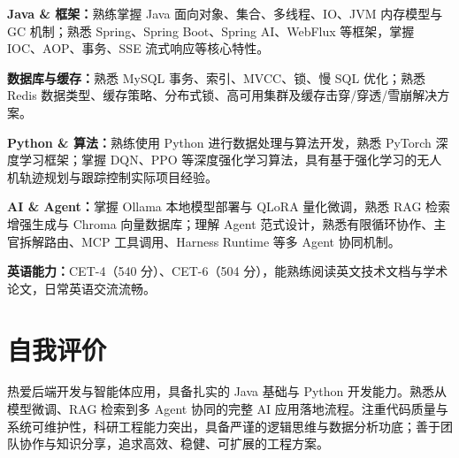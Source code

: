 \documentclass[11pt,a4paper,fontset=none]{ctexart}
\begin{document}
\par\noindent \textbf{Java \& 框架：}熟练掌握 Java 面向对象、集合、多线程、IO、JVM 内存模型与 GC 机制；熟悉 Spring、Spring Boot、Spring AI、WebFlux 等框架，掌握 IOC、AOP、事务、SSE 流式响应等核心特性。

\par\noindent \textbf{数据库与缓存：}熟悉 MySQL 事务、索引、MVCC、锁、慢 SQL 优化；熟悉 Redis 数据类型、缓存策略、分布式锁、高可用集群及缓存击穿/穿透/雪崩解决方案。

\par\noindent \textbf{Python \& 算法：}熟练使用 Python 进行数据处理与算法开发，熟悉 PyTorch 深度学习框架；掌握 DQN、PPO 等深度强化学习算法，具有基于强化学习的无人机轨迹规划与跟踪控制实际项目经验。

\par\noindent \textbf{AI \& Agent：}掌握 Ollama 本地模型部署与 QLoRA 量化微调，熟悉 RAG 检索增强生成与 Chroma 向量数据库；理解 Agent 范式设计，熟悉有限循环协作、主官拆解路由、MCP 工具调用、Harness Runtime 等多 Agent 协同机制。

\par\noindent \textbf{英语能力：}CET-4（540 分）、CET-6（504 分），能熟练阅读英文技术文档与学术论文，日常英语交流流畅。

\section*{自我评价}
\vspace{-0.1em}

\par\noindent 热爱后端开发与智能体应用，具备扎实的 Java 基础与 Python 开发能力。熟悉从模型微调、RAG 检索到多 Agent 协同的完整 AI 应用落地流程。注重代码质量与系统可维护性，科研工程能力突出，具备严谨的逻辑思维与数据分析功底；善于团队协作与知识分享，追求高效、稳健、可扩展的工程方案。
\end{document}

